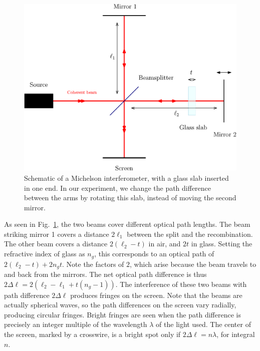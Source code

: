 \documentclass[11pt]{article}
\begin{document}
        \begin{figure}[H]
        \centering
                \includegraphics[scale=0.7]{./michelson.eps}
        \caption{Schematic of a Michelson interferometer, with a glass slab inserted in one end. In our experiment, we change the path difference
                between the arms by rotating this slab, instead of moving the second mirror.}
        \label{fig:michelson}
        \end{figure}

        As seen in Fig.~\ref{fig:michelson}, the two beams cover different optical path lengths.
        The beam striking mirror 1 covers a distance $2\ell_1$ between the split and the recombination.
        The other beam covers a distance $2(\ell_2 - t)$ in air, and $2t$ in glass. Setting the refractive index of glass as $n_g$,
        this corresponds to an optical path of $2(\ell_2 - t) + 2n_gt$. Note the factors of $2$, which arise because the beam travels to and back
        from the mirrors. The net optical path difference is thus $2\Delta\ell = 2(\ell_2 - \ell_1 + t(n_g - 1))$.
        The interference of these two beams with path difference $2\Delta\ell$ produces fringes on the screen.
        Note that the beams are actually spherical waves, so the path differences on the screen vary radially, producing circular fringes.
        Bright fringes are seen when the path difference is precisely an integer multiple of the wavelength $\lambda$ of the light used.
        The center of the screen, marked by a crosswire, is a bright spot only if $2\Delta\ell = n\lambda$, for integral $n$.
        
\end{document}
